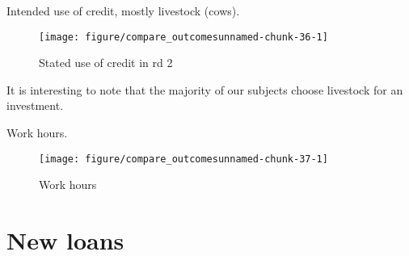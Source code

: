 Intended use of credit, mostly livestock (cows).
\begin{Schunk}
\begin{figure}

{\centering \texttt{[image: figure/compare\_outcomesunnamed-chunk-36-1]} 

}

\caption[Stated use of credit in rd 2]{Stated use of credit in rd 2}\label{Figureunnamed-chunk-36}
\end{figure}
\end{Schunk}
It is interesting to note that the majority of our subjects choose livestock for an investment. 

Work hours.
\begin{Schunk}
\begin{figure}

{\centering \texttt{[image: figure/compare\_outcomesunnamed-chunk-37-1]} 

}

\caption[Work hours]{Work hours}\label{Figureunnamed-chunk-37}
\end{figure}
\end{Schunk}

\section{New loans}

